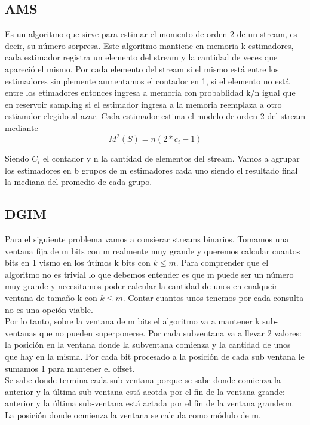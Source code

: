 \documentclass[titlepage,a4paper]{article}
\begin{document}
\subsection*{AMS} 
Es un algoritmo que sirve para estimar el momento de orden 2 de un stream, es decir, su número sorpresa. Este algoritmo mantiene en memoria k estimadores, cada estimador registra un elemento del stream y la cantidad de veces que apareció el mismo. Por cada elemento del stream si el mismo está entre los estimadores simplemente aumentamos el contador en 1, si el elemento no está entre los etimadores entonces ingresa a memoria con probablidad k/n igual que en reservoir sampling si el estimador ingresa a la memoria reemplaza a otro estiamdor elegido al azar.  Cada estimador estima el modelo de orden 2 del stream mediante $$M^2(S) = n(2*c_{i}-1)$$ 

Siendo $C_i$ el contador y n la cantidad de elementos del stream.  Vamos a agrupar los estimadores en b grupos de m estimadores cada uno siendo el resultado final la mediana del promedio de cada grupo. 

\subsection*{DGIM} 
Para el siguiente problema vamos a consierar streams binarios. Tomamos una ventana fija de m bits con m realmente muy grande y queremos calcular cuantos bits en 1 vismo en los útimos k bits con $k \leq m$. Para comprender que el algoritmo no es trivial lo que debemos entender es que m puede ser un número muy grande y necesitamos poder calcular la cantidad de unos en cualqueir ventana de tamaño k con  $k \leq m$. Contar cuantos unos tenemos por cada consulta no es una opción viable. \\

Por lo tanto, sobre la ventana de m bits el algoritmo va a mantener k sub-ventanas que no pueden superponerse. Por cada subventana va a llevar 2 valores: la posición en la ventana donde la subventana comienza y la cantidad de unos que hay en la misma. Por cada bit procesado a la posición de cada sub ventana le sumamos 1 para mantener el offset.\\

 Se sabe donde termina cada sub ventana porque se sabe donde comienza la anterior y la última sub-ventana está acotda por el fin de la ventana grande: anterior y la última sub-ventana está actada por el fin de la ventana grande:m. La posición donde ocmienza la ventana se calcula como módulo de m. \\
 
\end{document}
